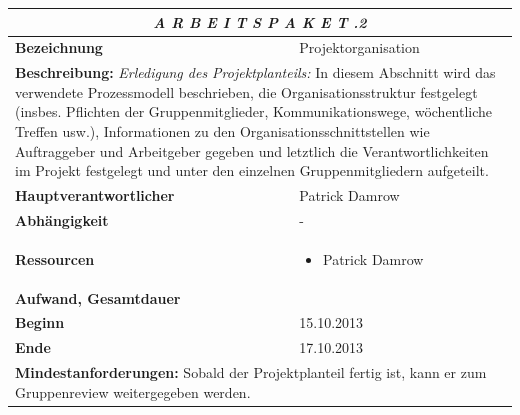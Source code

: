 \documentclass[fontsize=12pt,paper=a4,twoside]{scrartcl}
\begin{document}
\begin{tabular}{p{7.5cm}|p{7.5cm}}\toprule
\multicolumn{2}{c}{\textbf{\textit{A R B E I T S P A K E T \quad 1.1.2}}} \\ \toprule \hline
\textbf{Bezeichnung} & Projektorganisation\\\hline
\multicolumn{2}{p{15cm}}{\textbf{Beschreibung:} \newline 
\textit{Erledigung des Projektplanteils:} In diesem Abschnitt wird das verwendete Prozessmodell beschrieben, die Organisationsstruktur festgelegt (insbes. Pflichten der Gruppenmitglieder, Kommunikationswege, wöchentliche Treffen usw.), Informationen zu den Organisationsschnittstellen wie Auftraggeber und Arbeitgeber gegeben und letztlich die Verantwortlichkeiten im Projekt festgelegt und unter den einzelnen Gruppenmitgliedern aufgeteilt.    }  \\\hline
\textbf{Hauptverantwortlicher} & Patrick Damrow\\\hline
\textbf{Abhängigkeit} & -\\\hline
\textbf{Ressourcen} & \begin{itemize}
\itemsep0pt
\item Patrick Damrow
\end{itemize} \\\hline
\textbf{Aufwand, Gesamtdauer} & \\\hline
\textbf{Beginn} & 15.10.2013 \\\hline
\textbf{Ende} & 17.10.2013\\\hline
\multicolumn{2}{p{15cm}}{\textbf{Mindestanforderungen: } \newline
Sobald der Projektplanteil fertig ist, kann er zum Gruppenreview weitergegeben werden. }  \\ \toprule
\end{tabular} \\\\
\end{document}

